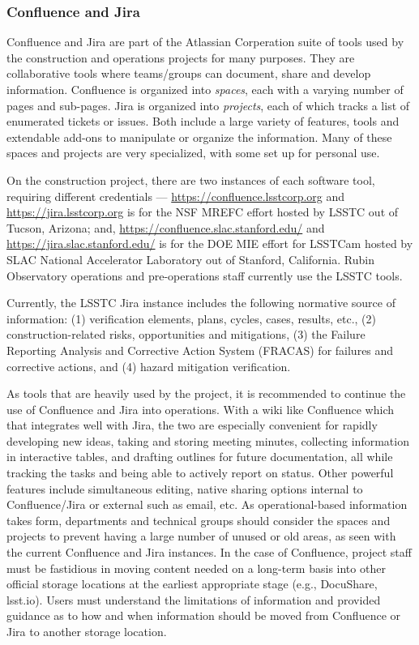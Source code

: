 \subsubsection{Confluence and Jira}
\label{confluence-jira-storage}

Confluence \citep{Confluence-cite} and Jira \citep{Jira-cite} are part of the Atlassian Corperation suite of tools used by the construction and operations projects for many purposes.
They are collaborative tools where teams/groups can document, share and develop information.
Confluence is organized into \emph{spaces}, each with a varying number of pages and sub-pages.
Jira is organized into \emph{projects}, each of which tracks a list of enumerated tickets or issues.
Both include a large variety of features, tools and extendable add-ons to manipulate or organize the information.
Many of these spaces and projects are very specialized, with some set up for personal use.

On the construction project, there are two instances of each software tool, requiring different credentials --- \url{https://confluence.lsstcorp.org} and \url{https://jira.lsstcorp.org} is for the NSF MREFC effort hosted by LSSTC out of Tucson, Arizona; and, \url{https://confluence.slac.stanford.edu/} and \url{https://jira.slac.stanford.edu/} is for the DOE MIE effort for LSSTCam hosted by SLAC National Accelerator Laboratory out of Stanford, California.
Rubin Observatory operations and pre-operations staff currently use the LSSTC tools.

Currently, the LSSTC Jira instance includes the following normative source of information:
(1) verification elements, plans, cycles, cases, results, etc.,
(2) construction-related risks, opportunities and mitigations,
(3) the Failure Reporting Analysis and Corrective Action System (FRACAS) for failures and corrective actions,
and (4) hazard mitigation verification.

As tools that are heavily used by the project, it is recommended to continue the use of Confluence and Jira into operations.
With a wiki like Confluence which that integrates well with Jira, the two are especially convenient for rapidly developing new ideas, taking and storing meeting minutes, collecting information in interactive tables, and drafting outlines for future documentation, all while tracking the tasks and being able to actively report on status.
Other powerful features include simultaneous editing, native sharing options internal to Confluence/Jira or external such as email, etc.
As operational-based information takes form, departments and technical groups should consider the spaces and projects to prevent having a large number of unused or old areas, as seen with the current Confluence and Jira instances.
In the case of Confluence, project staff must be fastidious in moving content needed on a long-term basis into other official storage locations at the earliest appropriate stage (e.g., DocuShare, lsst.io).
Users must understand the limitations of information and provided guidance as to how and when information should be moved from Confluence or Jira to another storage location.

